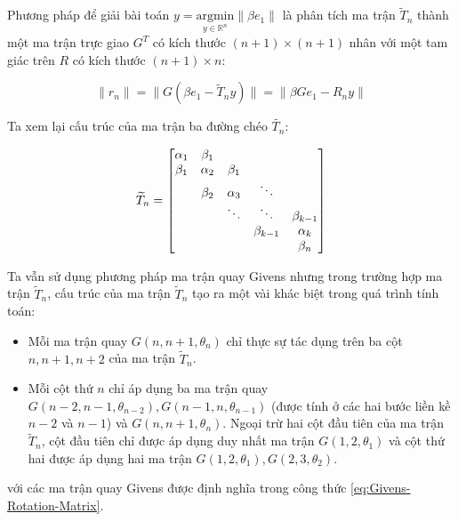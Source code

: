 \documentclass[14pt, a4paper]{article}
\numberwithin{equation}{section}
\numberwithin{algorithm}{section}
\numberwithin{figure}{section}
\numberwithin{dl}{section}
\numberwithin{md}{section}
\numberwithin{bd}{section}
\numberwithin{dn}{section}
\numberwithin{hq}{section}
\begin{document}
Phương pháp để giải bài toán $y=\underset{y \in \mathbb{R}^n}{\mathrm{argmin}} \lVert \beta e_1  \rVert$ là phân tích ma trận $\widetilde{T}_n$ thành một ma trận trực giao $G^T$ có kích thước $(n+1) \times (n+1)$ nhân với một tam giác trên $R$ có kích thước $(n+1) \times n$:

\begin{equation}
    \lVert r_n \rVert = \lVert G(\beta e_1 - \widetilde{T}_n y) \rVert = \lVert \beta G e_1 - R_n y \rVert
\end{equation}

Ta xem lại cấu trúc của ma trận ba đường chéo $\widetilde{T_n}$:

\begin{equation}
    \widetilde{T}_n = \begin{bmatrix}
        \alpha_1 & \beta_1 & \space & \space & \space \\
        \beta_1 & \alpha_2 & \beta_1 & \space & \space \\
        \space & \beta_2 & \alpha_3 & \ddots & \space \\
        \space & \space & \ddots & \ddots & \beta_{k-1} \\
        \space & \space & \space & \beta_{k-1} & \alpha_k \\
        \space & \space & \space & \space & \beta_{n}
    \end{bmatrix}
\end{equation}

Ta vẫn sử dụng phương pháp ma trận quay Givens nhưng trong trường hợp ma trận $\widetilde{T}_n$, cấu trúc của ma trận $\widetilde{T}_n$ tạo ra một vài khác biệt trong quá trình tính toán:

\begin{itemize}
    \item Mỗi ma trận quay $G(n, n+1, \theta_n)$ chỉ thực sự tác dụng trên ba cột $n, n+1, n+2$ của ma trận $\widetilde{T}_n$.
    \item Mỗi cột thứ $n$ chỉ áp dụng ba ma trận quay $G(n-2, n-1, \theta_{n-2}), G(n-1, n, \theta_{n-1})$ (được tính ở các hai bước liền kề $n-2$ và $n-1$) và $G(n, n+1, \theta_n)$. Ngoại trừ hai cột đầu tiên của ma trận $\widetilde{T}_n$, cột đầu tiên chỉ được áp dụng duy nhất ma trận $G(1, 2, \theta_1)$ và cột thứ hai được áp dụng hai ma trận $G(1, 2, \theta_1), G(2, 3,\theta_2)$.
\end{itemize}

với các ma trận quay Givens được định nghĩa trong công thức \ref{eq:Givens-Rotation-Matrix}.
\end{document}
